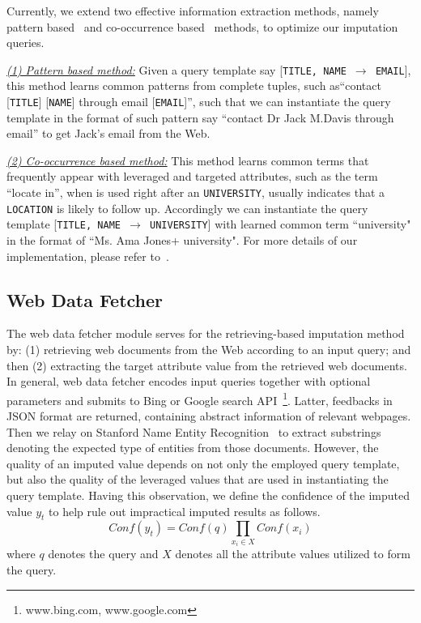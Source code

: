 \documentclass[sigconf]{acmart}
\begin{document}

Currently, we extend two effective information extraction methods, namely pattern based~\cite{hearst1992automatic} and co-occurrence based~\cite{li2014core} methods, to optimize our imputation queries.

\noindent\underline{\it (1) Pattern based method:} Given a query template say [{\tt TITLE, NAME $\to$ EMAIL}], this method learns common patterns from complete tuples, such as``contact [{\tt TITLE}] [{\tt NAME}] through email [{\tt EMAIL}]'', such that we can instantiate the query template in the format of such pattern say ``contact Dr Jack M.Davis through email'' to get Jack's email from the Web.

\noindent\underline{\it (2) Co-occurrence based method:} This method learns common terms that frequently appear with leveraged and targeted attributes, such as the term ``locate in'', when is used right after an {\tt UNIVERSITY}, usually indicates that a {\tt LOCATION} is likely to follow up. Accordingly we can instantiate the query template [{\tt TITLE, NAME $\to$ UNIVERSITY}] with learned common term  ``university" in the format of ``Ms. Ama Jones+ university". For more details of our implementation, please refer to~\cite{li2012webput}.

\subsection{Web Data Fetcher}
The web data fetcher module serves for the retrieving-based imputation method by: (1) retrieving web documents from the Web according to an input query; and then (2) extracting the target attribute value from the retrieved web documents.
%
In general, web data fetcher encodes input queries together with optional parameters and submits to Bing or Google search API~\footnote{www.bing.com, www.google.com}. Latter, feedbacks in JSON format are returned, containing abstract information of relevant webpages. Then we relay on Stanford Name Entity Recognition~\cite{mikheev1999named} to extract substrings denoting the expected type of entities from those documents.
%
However, the quality of an imputed value depends on not only the employed query template, but also the quality of the leveraged values that are used in instantiating the query template. Having this observation, we define the confidence of the imputed value $y_t$ to help rule out impractical imputed results as follows.
\begin{equation}
Conf(y_t)=Conf(q)\prod_{x_i \in X}Conf(x_i)
\end{equation}
where $q$ denotes the query and $X$ denotes all the  attribute values utilized to form the query.
\end{document}
